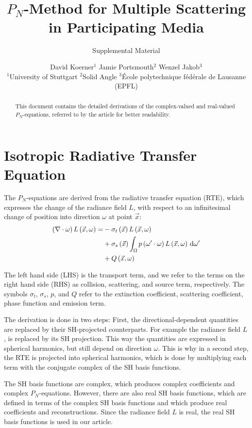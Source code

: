 \documentclass[10pt]{scrartcl}
\title{$P_N$-Method for Multiple Scattering in Participating Media}
\subtitle{Supplemental Material}
\author
{
David Koerner$^1$
\qquad Jamie Portsmouth$^2$
\qquad Wenzel Jakob$^3$
\\
\small
$^1$University of Stuttgart
\qquad $^2$Solid Angle
\qquad $^3$\'{E}cole polytechnique f\'{e}d\'{e}rale de Lausanne (EPFL)
}
\date{}
\begin{document}
%
\maketitle
\begin{abstract}
This document contains the detailed derivations of the complex-valued and real-valued $P_N$-equations, referred to by the article for better readability.
\end{abstract}

\tableofcontents

\newpage


\section{Isotropic Radiative Transfer Equation}

The $P_N$-equations are derived from the radiative transfer equation (RTE), which expresses the change of the radiance field $L$, with respect to an infinitesimal change of position into direction $\omega$ at point $\vec{x}$:
\begin{align}
\left(\nabla\cdot\omega\right)L\left(\vec{x}, \omega \right)
=&
-\sigma_t\left(\vec{x}\right) L\left(\vec{x}, \omega \right)\nonumber\\
&
+\sigma_s\left(\vec{x}\right) \int_{\Omega}
{
p\left(\omega'\cdot\omega\right)L\left(\vec{x}, \omega \right)\,\mathrm{d}\omega'
}\nonumber\\
&
+Q\left(\vec{x}, \omega\right)\nonumber
\end{align}

The left hand side (LHS) is the transport term, and we refer to the terms on the right hand side (RHS) as collision, scattering, and source term, respectively. The symbols $\sigma_t$, $\sigma_s$, $p$, and $Q$ refer to the extinction coefficient, scattering coefficient, phase function and emission term.

The derivation is done in two steps: First, the directional-dependent quantities are replaced by their SH-projected counterparts. For example the radiance field $L$, is replaced by its SH projection. This way the quantities are expressed in spherical harmonics, but still depend on direction $\omega$. This is why in a second step, the RTE is projected into spherical harmonics, which is done by multiplying each term with the conjugate complex of the SH basis functions.

The SH basis functions are complex, which produces complex coefficients and complex $P_N$-equations. However, there are also real SH basis functions, which are defined in terms of the complex SH basis functions and which produce real coefficients and reconstructions. Since the radiance field $L$ is real, the real SH basis functions is used in our article.
\end{document}
